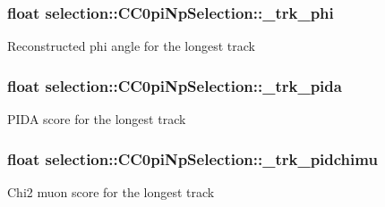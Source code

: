 \subsubsection[{\texorpdfstring{\+\_\+trk\+\_\+phi}{_trk_phi}}]{\setlength{\rightskip}{0pt plus 5cm}float selection\+::\+C\+C0pi\+Np\+Selection\+::\+\_\+trk\+\_\+phi\hspace{0.3cm}{\ttfamily [private]}}\hypertarget{classselection_1_1CC0piNpSelection_a85a6029e249e3ff20ea6d8eaabf22142}{}\label{classselection_1_1CC0piNpSelection_a85a6029e249e3ff20ea6d8eaabf22142}
Reconstructed phi angle for the longest track 
\subsubsection[{\texorpdfstring{\+\_\+trk\+\_\+pida}{_trk_pida}}]{\setlength{\rightskip}{0pt plus 5cm}float selection\+::\+C\+C0pi\+Np\+Selection\+::\+\_\+trk\+\_\+pida\hspace{0.3cm}{\ttfamily [private]}}\hypertarget{classselection_1_1CC0piNpSelection_af0fe49227e33b3f46015a821de58ba1f}{}\label{classselection_1_1CC0piNpSelection_af0fe49227e33b3f46015a821de58ba1f}
P\+I\+DA score for the longest track 
\subsubsection[{\texorpdfstring{\+\_\+trk\+\_\+pidchimu}{_trk_pidchimu}}]{\setlength{\rightskip}{0pt plus 5cm}float selection\+::\+C\+C0pi\+Np\+Selection\+::\+\_\+trk\+\_\+pidchimu\hspace{0.3cm}{\ttfamily [private]}}\hypertarget{classselection_1_1CC0piNpSelection_a74ddf5622f3ee32110e9342361020a89}{}\label{classselection_1_1CC0piNpSelection_a74ddf5622f3ee32110e9342361020a89}
Chi2 muon score for the longest track 
